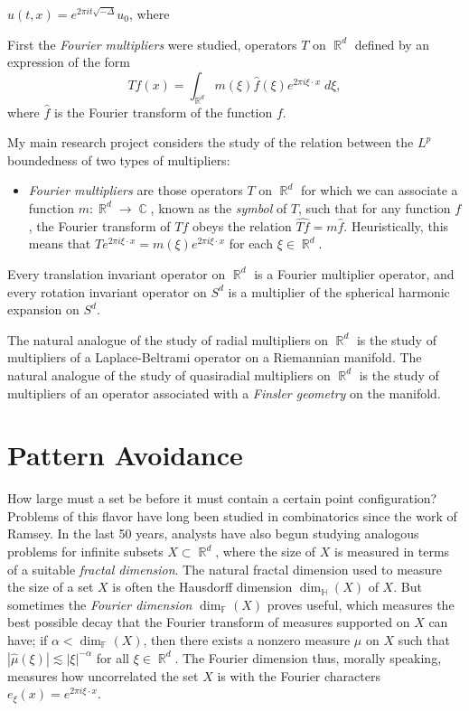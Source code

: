 \documentclass[12pt]{article}
\DeclareMathOperator{\RR}{\mathbb{R}}
\DeclareMathOperator{\CC}{\mathbb{C}}
\begin{document}
$u(t,x) = e^{2 \pi i t \sqrt{-\Delta}} u_0$, where

First the \emph{Fourier multipliers} were studied, operators $T$ on $\RR^d$ defined by an expression of the form
%
\[ Tf(x) = \int_{\RR^d} m(\xi) \widehat{f}(\xi) e^{2 \pi i \xi \cdot x}\; d\xi, \]
%
where $\widehat{f}$ is the Fourier transform of the function $f$.

My main research project considers the study of the relation between the $L^p$ boundedness of two types of multipliers:
%
\begin{itemize}
	\item \emph{Fourier multipliers} are those operators $T$ on $\RR^d$ for which we can associate a function $m: \RR^d \to \CC$, known as the \emph{symbol} of $T$, such that for any function $f$, the Fourier transform of $Tf$ obeys the relation $\widehat{Tf} = m \widehat{f}$. Heuristically, this means that $T e^{2 \pi i \xi \cdot x} = m(\xi) e^{2 \pi i \xi \cdot x}$ for each $\xi \in \RR^d$.
\end{itemize}

  Every translation invariant operator on $\RR^d$ is a Fourier multiplier operator, and every rotation invariant operator on $S^d$ is a multiplier of the spherical harmonic expansion on $S^d$.



The natural analogue of the study of radial multipliers on $\RR^d$ is the study of multipliers of a Laplace-Beltrami operator on a Riemannian manifold. The natural analogue of the study of quasiradial multipliers on $\RR^d$ is the study of multipliers of an operator associated with a \emph{Finsler geometry} on the manifold.

\section*{Pattern Avoidance}

How large must a set be before it must contain a certain point configuration? Problems of this flavor have long been studied in combinatorics since the work of Ramsey. In the last 50 years, analysts have also begun studying analogous problems for infinite subsets $X \subset \RR^d$, where the size of $X$ is measured in terms of a suitable \emph{fractal dimension}. The natural fractal dimension used to measure the size of a set $X$ is often the Hausdorff dimension $\dim_{\mathbb{H}}(X)$ of $X$. But sometimes the \emph{Fourier dimension} $\dim_{\mathbb{F}}(X)$ proves useful, which measures the best possible decay that the Fourier transform of measures supported on $X$ can have; if $\alpha < \dim_{\mathbb{F}}(X)$, then there exists a nonzero measure $\mu$ on $X$ such that $|\widehat{\mu}(\xi)| \lesssim |\xi|^{-\alpha}$ for all $\xi \in \RR^d$. The Fourier dimension thus, morally speaking, measures how uncorrelated the set $X$ is with the Fourier characters $e_\xi(x) = e^{2 \pi i \xi \cdot x}$.
\end{document}
